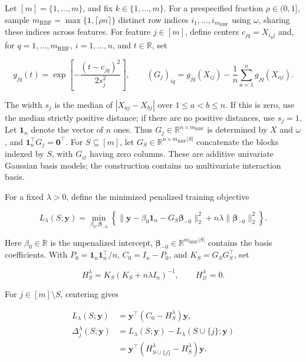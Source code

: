 \documentclass[
  11pt,
]{article}
\begin{document}
Let \([m]=\{1,\ldots,m\}\), and fix \(k\in\{1,\ldots,m\}\). For a
prespecified fraction \(\rho\in(0,1]\), sample
\(m_{\mathrm{RBF}}=\max\{1,\lceil\rho n\rceil\}\) distinct row indices
\(i_1,\ldots,i_{m_{\mathrm{RBF}}}\) using \(\omega\), sharing these
indices across features. For feature \(j\in[m]\), define centers
\(c_{jq}=X_{i_qj}\) and, for \(q=1,\ldots,m_{\mathrm{RBF}}\),
\(i=1,\ldots,n\), and \(t\in\mathbb R\), set

\[
g_{jq}(t)=\exp\!\left[-\frac{(t-c_{jq})^2}{2s_j^2}\right],\qquad
(G_j)_{iq}=g_{jq}(X_{ij})-\frac1n\sum_{a=1}^n g_{jq}(X_{aj}).
\tag{2}
\]

The width \(s_j\) is the median of \(|X_{aj}-X_{bj}|\) over
\(1\le a<b\le n\). If this is zero, use the median strictly positive
distance; if there are no positive distances, use \(s_j=1\). Let
\(\mathbf1_n\) denote the vector of \(n\) ones. Thus
\(G_j\in\mathbb R^{n\times m_{\mathrm{RBF}}}\) is determined by \(X\)
and \(\omega\), and \(\mathbf1_n^\top G_j=\boldsymbol0^\top\). For
\(S\subseteq[m]\), let \(G_S\in\mathbb R^{n\times m_{\mathrm{RBF}}|S|}\)
concatenate the blocks indexed by \(S\), with \(G_\varnothing\) having
zero columns. These are additive univariate Gaussian basis models; the
construction contains no multivariate interaction basis.


For a fixed \(\lambda>0\), define the minimized penalized training
objective

\[
L_\lambda(S;\boldsymbol y)=\min_{\beta_0,\boldsymbol\beta_{-0}}\left\{
\|\boldsymbol y-\beta_0\mathbf1_n-G_S\boldsymbol\beta_{-0}\|_2^2+n\lambda\|\boldsymbol\beta_{-0}\|_2^2\right\}.
\tag{3}
\]

Here \(\beta_0\in\mathbb R\) is the unpenalized intercept,
\(\boldsymbol\beta_{-0}\in\mathbb R^{m_{\mathrm{RBF}}|S|}\) contains the
basis coefficients. With \(P_0=\mathbf1_n\mathbf1_n^\top/n\),
\(C_0=I_n-P_0\), and \(K_S=G_SG_S^\top\), set

\[
H_S^\lambda=K_S(K_S+n\lambda I_n)^{-1},\qquad H_\varnothing^\lambda=0.
\]

For \(j\in[m]\setminus S\), centering gives

\[
\begin{aligned}
L_\lambda(S;\boldsymbol y)&=\boldsymbol y^\top(C_0-H_S^\lambda)\boldsymbol y,\\
\Delta_j^\lambda(S;\boldsymbol y)&=L_\lambda(S;\boldsymbol y)-L_\lambda(S\cup\{j\};\boldsymbol y)\\
&=\boldsymbol y^\top(H_{S\cup\{j\}}^\lambda-H_S^\lambda)\boldsymbol y.
\end{aligned}
\tag{4}
\]
\end{document}
